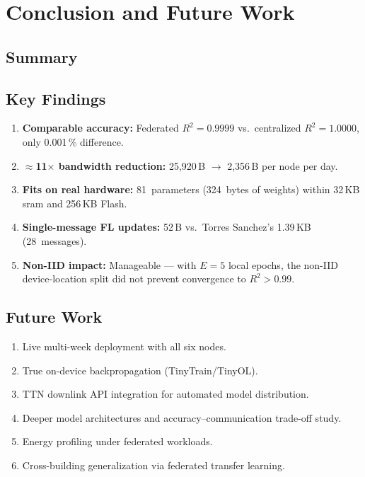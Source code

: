 \chapter{Conclusion and Future Work}
\label{ch:conclusion}

\section{Summary}

\section{Key Findings}
\begin{enumerate}
  \item \textbf{Comparable accuracy:} Federated $R^2 = 0.9999$ vs.\ centralized $R^2 = 1.0000$, only 0.001\,\% difference.
  \item \textbf{$\approx$11$\times$ bandwidth reduction:} 25{,}920\,B $\to$ 2{,}356\,B per node per day.
  \item \textbf{Fits on real hardware:} 81~parameters (324~bytes of weights) within 32\,KB \gls{sram} and 256\,KB Flash.
  \item \textbf{Single-message FL updates:} 52\,B vs.\ Torres Sanchez's 1.39\,KB (28~messages).
  \item \textbf{Non-IID impact:} Manageable --- with $E=5$ local epochs, the non-IID device-location split did not prevent convergence to $R^2 > 0.99$.
\end{enumerate}

\section{Future Work}
\begin{enumerate}
  \item Live multi-week deployment with all six nodes.
  \item True on-device backpropagation (TinyTrain/TinyOL).
  \item TTN downlink API integration for automated model distribution.
  \item Deeper model architectures and accuracy--communication trade-off study.
  \item Energy profiling under federated workloads.
  \item Cross-building generalization via federated transfer learning.
\end{enumerate}
